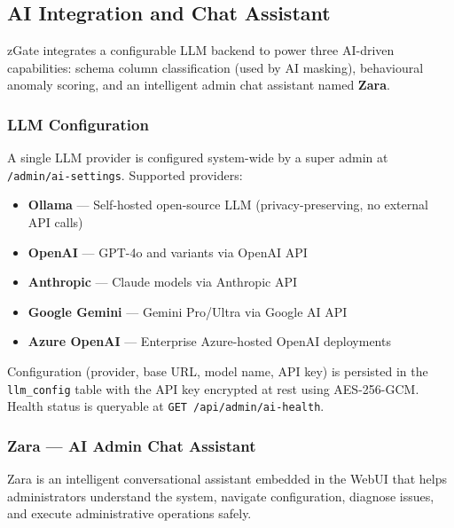 \subsection{AI Integration and Chat Assistant}
\label{subsec:ai-integration}

zGate integrates a configurable LLM backend to power three AI-driven capabilities: schema column classification (used by AI masking), behavioural anomaly scoring, and an intelligent admin chat assistant named \textbf{Zara}.

\subsubsection{LLM Configuration}

A single LLM provider is configured system-wide by a super admin at \texttt{/admin/ai-settings}. Supported providers:

\begin{itemize}[leftmargin=*]
    \item \textbf{Ollama} — Self-hosted open-source LLM (privacy-preserving, no external API calls)
    \item \textbf{OpenAI} — GPT-4o and variants via OpenAI API
    \item \textbf{Anthropic} — Claude models via Anthropic API
    \item \textbf{Google Gemini} — Gemini Pro/Ultra via Google AI API
    \item \textbf{Azure OpenAI} — Enterprise Azure-hosted OpenAI deployments
\end{itemize}

Configuration (provider, base URL, model name, API key) is persisted in the \texttt{llm\_config} table with the API key encrypted at rest using AES-256-GCM. Health status is queryable at \texttt{GET /api/admin/ai-health}.

\subsubsection{Zara — AI Admin Chat Assistant}

Zara is an intelligent conversational assistant embedded in the WebUI that helps administrators understand the system, navigate configuration, diagnose issues, and execute administrative operations safely.


